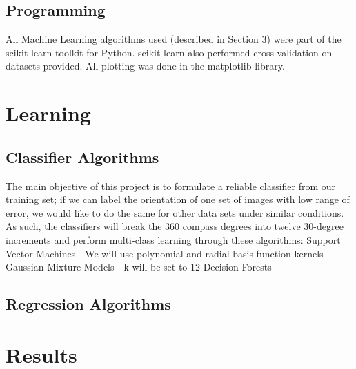 \documentclass{article}
\begin{document}
\subsection{Programming}
All Machine Learning algorithms used (described in Section 3) were part of the scikit-learn toolkit for Python. scikit-learn also performed cross-validation on datasets provided. All plotting was done in the matplotlib library. 

\section{Learning}

\subsection{Classifier Algorithms}
The main objective of this project is to formulate a reliable classifier from our training set; if we can label the orientation of one set of images with low range of error, we would like to do the same for other data sets under similar conditions. As such, the classifiers will break the 360 compass degrees into twelve 30-degree increments and perform multi-class learning through these algorithms: 
Support Vector Machines - We will use polynomial and radial basis function kernels
Gaussian Mixture Models - k will be set to 12 
Decision Forests




\subsection{Regression Algorithms}



\section{Results}
\end{document}
